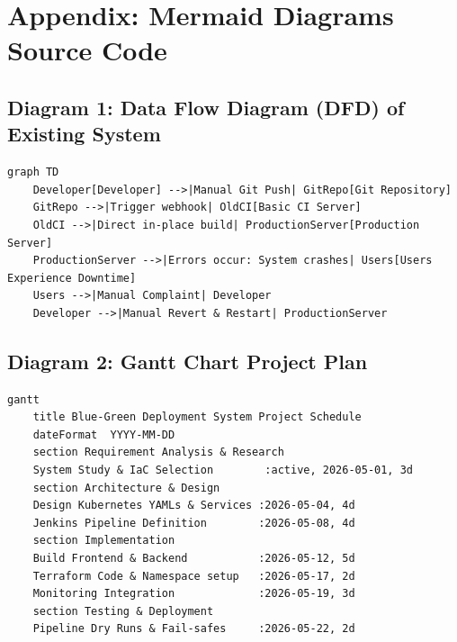 \documentclass[12pt,a4paper]{article}
\begin{document}
\newpage
\section*{Appendix: Mermaid Diagrams Source Code}

\subsection*{Diagram 1: Data Flow Diagram (DFD) of Existing System}
\begin{lstlisting}
graph TD
    Developer[Developer] -->|Manual Git Push| GitRepo[Git Repository]
    GitRepo -->|Trigger webhook| OldCI[Basic CI Server]
    OldCI -->|Direct in-place build| ProductionServer[Production Server]
    ProductionServer -->|Errors occur: System crashes| Users[Users Experience Downtime]
    Users -->|Manual Complaint| Developer
    Developer -->|Manual Revert & Restart| ProductionServer
\end{lstlisting}

\subsection*{Diagram 2: Gantt Chart Project Plan}
\begin{lstlisting}
gantt
    title Blue-Green Deployment System Project Schedule
    dateFormat  YYYY-MM-DD
    section Requirement Analysis & Research
    System Study & IaC Selection        :active, 2026-05-01, 3d
    section Architecture & Design
    Design Kubernetes YAMLs & Services :2026-05-04, 4d
    Jenkins Pipeline Definition        :2026-05-08, 4d
    section Implementation
    Build Frontend & Backend           :2026-05-12, 5d
    Terraform Code & Namespace setup   :2026-05-17, 2d
    Monitoring Integration             :2026-05-19, 3d
    section Testing & Deployment
    Pipeline Dry Runs & Fail-safes     :2026-05-22, 2d
\end{lstlisting}
\end{document}
